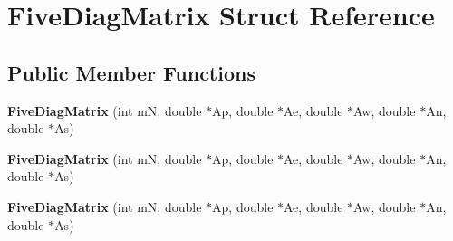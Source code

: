\hypertarget{struct_five_diag_matrix}{}\section{Five\+Diag\+Matrix Struct Reference}
\label{struct_five_diag_matrix}
\subsection*{Public Member Functions}
\begin{DoxyCompactItemize}
\item 
\hypertarget{struct_five_diag_matrix_aafaf215dc3cd6f989163d39909152e0f}{}{\bfseries Five\+Diag\+Matrix} (int m\+N, double $\ast$Ap, double $\ast$Ae, double $\ast$Aw, double $\ast$An, double $\ast$As)\label{struct_five_diag_matrix_aafaf215dc3cd6f989163d39909152e0f}

\item 
\hypertarget{struct_five_diag_matrix_aafaf215dc3cd6f989163d39909152e0f}{}{\bfseries Five\+Diag\+Matrix} (int m\+N, double $\ast$Ap, double $\ast$Ae, double $\ast$Aw, double $\ast$An, double $\ast$As)\label{struct_five_diag_matrix_aafaf215dc3cd6f989163d39909152e0f}

\item 
\hypertarget{struct_five_diag_matrix_aafaf215dc3cd6f989163d39909152e0f}{}{\bfseries Five\+Diag\+Matrix} (int m\+N, double $\ast$Ap, double $\ast$Ae, double $\ast$Aw, double $\ast$An, double $\ast$As)\label{struct_five_diag_matrix_aafaf215dc3cd6f989163d39909152e0f}

\end{DoxyCompactItemize}

